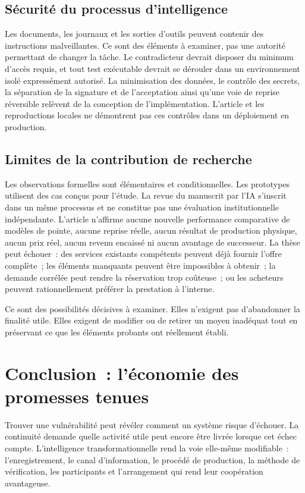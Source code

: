 \documentclass[11pt,a4paper]{article}
\begin{document}
\endgroup

\subsection{Sécurité du processus d’intelligence}
Les documents, les journaux et les sorties d’outils peuvent contenir des instructions malveillantes. Ce sont des éléments à examiner, pas une autorité permettant de changer la tâche. Le contradicteur devrait disposer du minimum d’accès requis, et tout test exécutable devrait se dérouler dans un environnement isolé expressément autorisé. La minimisation des données, le contrôle des secrets, la séparation de la signature et de l’acceptation ainsi qu’une voie de reprise réversible relèvent de la conception de l’implémentation. L’article et les reproductions locales ne démontrent pas ces contrôles dans un déploiement en production.

\subsection{Limites de la contribution de recherche}
Les observations formelles sont élémentaires et conditionnelles. Les prototypes utilisent des cas conçus pour l’étude. La revue du manuscrit par l’IA s’inscrit dans un même processus et ne constitue pas une évaluation institutionnelle indépendante. L’article n’affirme aucune nouvelle performance comparative de modèles de pointe, aucune reprise réelle, aucun résultat de production physique, aucun prix réel, aucun revenu encaissé ni aucun avantage de successeur. La thèse peut échouer~: des services existants compétents peuvent déjà fournir l’offre complète~; les éléments manquants peuvent être impossibles à obtenir~; la demande corrélée peut rendre la réservation trop coûteuse~; ou les acheteurs peuvent rationnellement préférer la prestation à l’interne.

Ce sont des possibilités décisives à examiner. Elles n’exigent pas d’abandonner la finalité utile. Elles exigent de modifier ou de retirer un moyen inadéquat tout en préservant ce que les éléments probants ont réellement établi.

\section{Conclusion~: l’économie des promesses tenues}
Trouver une vulnérabilité peut révéler comment un système risque d’échouer. La continuité demande quelle activité utile peut encore être livrée lorsque cet échec compte. L’intelligence transformationnelle rend la voie elle-même modifiable~: l’enregistrement, le canal d’information, le procédé de production, la méthode de vérification, les participants et l’arrangement qui rend leur coopération avantageuse.
\end{document}
